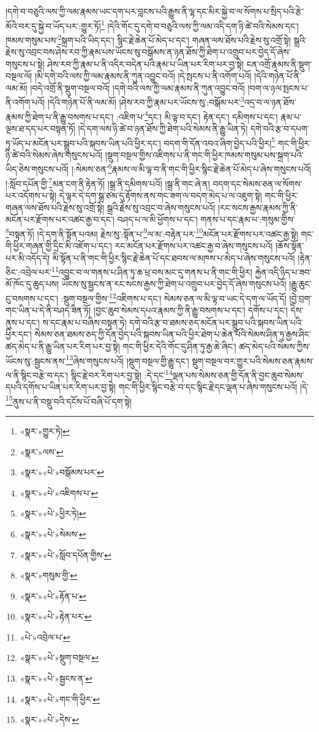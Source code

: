 །དགེ་བ་བཅུའི་ལས་ཀྱི་ལམ་རྣམས་ཡང་དག་པར་བླངས་པའི་རྒྱུས་ནི་ལྷ་དང་མིར་སྐྱེ་བ་ལ་སོགས་པ་སྲིད་པའི་རྩེ་མོའི་བར་དུ་སྐྱེ་བ་ཡོད་པར་:གྱུར་ཏོ།\footnote{«སྣར་»གྱུར་ཏེ།} །དེའི་གོང་དུ་དགེ་བ་བཅུའི་ལས་ཀྱི་ལམ་འདི་དག་ཉི་ཚེ་བའི་སེམས་དང་། ཁམས་གསུམ་པས་\footnote{«སྣར་»ལས་}སྐྲག་པའི་ཡིད་དང་། སྙིང་རྗེ་ཆེན་པོ་མེད་པ་དང་། གཞན་ལས་ཐོས་པའི་རྗེས་སུ་འགྲོ་སྟེ། སྒྲའི་རྗེས་སུ་འབྲང་བས་ཤེས་རབ་ཀྱི་རྣམ་པས་ཡོངས་སུ་བསྒོམས་ན་ཉན་ཐོས་ཀྱི་ཐེག་པ་འགྲུབ་པར་བྱེད་དོ་ཞེས་གསུངས་པ་སྟེ། ཤེས་རབ་ཀྱི་རྣམ་པ་ནི་འདིར་བདེན་པའི་རྣམ་པ་ཡིན་པར་རིག་པར་བྱ་སྟེ། ངན་འགྲོ་རྣམས་ནི་སྡུག་བསྔལ་ལོ། །མི་དགེ་བའི་ལས་ཀྱི་ལམ་རྣམས་ནི་ཀུན་འབྱུང་བའོ། །དེ་སྤངས་པ་ནི་འགོག་པའོ། །དེའི་གཉེན་པོ་ནི་ལམ་མོ། །བདེ་འགྲོ་ནི་སྡུག་བསྔལ་བའོ། །དགེ་བའི་ལས་ཀྱི་ལམ་རྣམས་ནི་ཀུན་འབྱུང་བའོ། །བག་ལ་ཉལ་སྤངས་པ་ནི་འགོག་པའོ། །དེའི་གཉེན་པོ་ནི་ལམ་མོ། །ཤེས་རབ་ཀྱི་རྣམ་པར་ཡོངས་སུ་:བསྒོམ་པར་\footnote{«སྣར་»«པེ་»བསྒོམས་པར་}འདྲ་བ་ལ་ཉན་ཐོས་རྣམས་ཀྱི་ཐེག་པ་ནི་རྒྱུ་བསགས་པ་དང་། :འཇིག་པ་\footnote{«སྣར་»«པེ་»འཇིགས་པ་}དང་། མི་ལྟ་བ་དང་། རྟེན་དང་། དམིགས་པ་དང་། རྣམ་པ་ལྔས་ཐ་དད་པར་བསྟན་ཏོ། །དེ་དག་ལས་ཉི་ཚེ་བ་ཉན་ཐོས་ཀྱི་ཐེག་པའི་སེམས་ནི་རྒྱུ་ཡིན་ཏེ། དགེ་བའི་རྩ་བ་དཔག་ཏུ་ཡོད་པ་མངོན་པར་སྒྲུབ་པའི་སྐབས་ཡིན་པའི་ཕྱིར་དང་། བདག་གི་དོན་འབའ་ཞིག་བྱེད་པའི་ཕྱིར།\footnote{«སྣར་»«པེ་»ཕྱིར་ཏེ།} གང་གི་ཕྱིར་ཉི་ཚེ་བའི་སེམས་ཞེས་གསུངས་པའོ། །སྡུག་བསྔལ་གྱིས་འཇིགས་པ་ནི་གང་གི་ཕྱིར་ཁམས་གསུམ་པས་སྐྲག་པའི་ཡིད་ཅེས་གསུངས་པའོ། །:སེམས་ཅན་\footnote{«སྣར་»«པེ་»སེམས་}རྣམས་ལ་མི་ལྟ་བ་ནི་གང་གི་ཕྱིར་སྙིང་རྗེ་ཆེན་པོ་མེད་པ་ཞེས་གསུངས་པའོ། །:སློབ་དཔོན་གྱི་\footnote{«སྣར་»«པེ་»སློབ་དཔོན་གྱིས་}མན་ངག་ནི་རྟེན་ཏོ། །སྒྲ་ནི་དམིགས་པའོ། །སྒྲ་ནི་གང་ཞེ་ན། བདག་དང་སེམས་ཅན་ལ་སོགས་པར་འདོགས་པ་སྟེ། དེ་ལྟར་དེ་དག་སྒྲ་ཙམ་དུ་རྟོགས་ནས་གང་ཟག་ལ་བདག་མེད་པ་ལ་འཇུག་སྟེ། གང་གི་ཕྱིར་གཞན་ལས་ཐོས་པའི་རྗེས་སུ་འགྲོ་སྟེ། སྒྲའི་རྗེས་སུ་འབྲང་བ་ཞེས་གསུངས་པའོ། །རང་སངས་རྒྱས་རྣམས་ཀྱི་ནི་མངོན་པར་རྫོགས་པར་འཚང་རྒྱ་བ་དང་། བཤད་པ་ལ་མི་ཕྱོགས་པ་དང་། གནས་པ་དང་རྣམ་པ་:གསུམ་གྱིས་\footnote{«སྣར་»གསུམ་གྱི་}བསྟན་ཏོ། །དེ་དག་ནི་སྟོན་པའམ། རྗེས་སུ་:སྟོན་པ་\footnote{«སྣར་»«པེ་»རྟོན་པ་}ལ་མ་:བརྟེན་པར་\footnote{«སྣར་»«པེ་»རྟེན་པར་}མངོན་པར་རྫོགས་པར་འཚང་རྒྱ་སྟེ། གང་གི་ཕྱིར་གཞན་གྱི་དྲིང་མི་འཇོག་པ་དང་། རང་མངོན་པར་རྫོགས་པར་འཚང་རྒྱ་བ་ཞེས་གསུངས་པའོ། །ཆོས་སྟོན་པར་མི་འདོད་དེ། མི་སྟོན་པ་ནི་གང་གི་ཕྱིར་སྙིང་རྗེ་ཆེན་པོ་དང་ཐབས་ལ་མཁས་པ་མེད་པ་ཞེས་གསུངས་པའོ། །རྟེན་ཅིང་:འབྲེལ་པར་\footnote{«པེ་»འབྲེལ་པ་}འབྱུང་བ་ལ་གནས་པ་ཤིན་ཏུ་ཆ་ཕྲ་བས་མང་དུ་གནས་པ་ནི་གང་གི་ཕྱིར། རྐྱེན་འདི་ཉིད་པ་ཟབ་མོ་ཁོང་དུ་ཆུད་པས། ཡོངས་སུ་སྦྱངས་ན་རང་སངས་རྒྱས་ཀྱི་ཐེག་པ་འགྲུབ་པར་བྱེད་དོ་ཞེས་གསུངས་པའོ། །རྒྱུ་ཆུང་ངུ་བསགས་པ་དང་། :སྡུག་བསྔལ་གྱིས་\footnote{«སྣར་»«པེ་»སྡུག་བསྔལ་}འཇིགས་པ་དང་། སེམས་ཅན་ལ་མི་ལྟ་བ་ཡང་དེ་དག་ལ་ཡོད་དོ། །བྱེ་བྲག་གང་ཡིན་པ་དེ་ནི་བཤད་ཟིན་ཏོ། །བྱང་ཆུབ་སེམས་དཔའ་རྣམས་ཀྱི་ནི་རྒྱུ་བསགས་པ་དང་། དགོས་པ་དང་། དེས་ནུས་པ་དང་། ས་དང་རྣམ་པ་བཞིས་བསྟན་ཏེ། དགེ་བའི་རྩ་བ་ཐམས་ཅད་མངོན་པར་སྒྲུབ་པའི་སྐབས་ཡིན་པའི་ཕྱིར་དང་། སེམས་ཅན་ཐམས་ཅད་ཀྱི་དོན་བྱེད་པའི་སྐབས་ཡིན་པའི་ཕྱིར་ཐེག་པ་ཆེན་པོའི་སེམས་ཤིན་ཏུ་རྒྱས་ཤིང་ཚད་མེད་པ་ནི་རྒྱུ་ཡིན་པར་རིག་པར་བྱ་སྟེ། གང་གི་ཕྱིར་དེའི་གོང་དུ་ཤིན་ཏུ་རྒྱ་ཆེ་ཞིང་། ཚད་མེད་པའི་སེམས་ཀྱིས་ཡོངས་སུ་:སྦྱངས་ནས་\footnote{«སྣར་»«པེ་»སྦྱངས་ན་}ཞེས་གསུངས་པའོ། །སྡུག་བསྔལ་གྱི་རྒྱུ་དང་། སྡུག་བསྔལ་བར་གྱུར་པའི་སེམས་ཅན་རྣམས་ལ་ནི་སྙིང་བརྩེ་བ་དང་། སྙིང་རྗེ་བར་རིག་པར་བྱ་སྟེ། :དེ་དང་\footnote{«སྣར་»«པེ་»གང་གི་ཕྱིར་}ལྡན་པས་སེམས་ཅན་གྱི་དོན་ནི་བྱང་ཆུབ་སེམས་དཔའི་དགོས་པ་ཡིན་པར་རིག་པར་བྱ་སྟེ། གང་གི་ཕྱིར་སྙིང་བརྩེ་བ་དང་སྙིང་རྗེ་དང་ལྡན་པ་ཞེས་གསུངས་པའོ། །དེ་\footnote{«སྣར་»«པེ་»དེས་}ནུས་པ་ནི་བསྡུ་བའི་དངོས་པོ་བཞི་པོ་དག་སྟེ། 